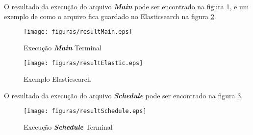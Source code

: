 O resultado da execução do arquivo \textit{\textbf{Main}} pode ser encontrado na figura \ref{image:result_main}, e um exemplo de como o arquivo fica guardado no Elasticsearch na figura \ref{image:result_elastic}.
\begin{figure} [H]
\centering
\texttt{[image: figuras/resultMain.eps]}
\caption{Execução \textit{\textbf{Main}} Terminal}
\label{image:result_main}
\end{figure}
\begin{figure} [H]
\centering
\texttt{[image: figuras/resultElastic.eps]}
\caption{Exemplo Elasticsearch}
\label{image:result_elastic}
\end{figure}
O resultado da execução do arquivo \textit{\textbf{Schedule}} pode ser encontrado na figura \ref{image:result_schedule}.
\begin{figure} [H]
\centering
\texttt{[image: figuras/resultSchedule.eps]}
\caption{Execução \textit{\textbf{Schedule}} Terminal}
\label{image:result_schedule}
\end{figure}